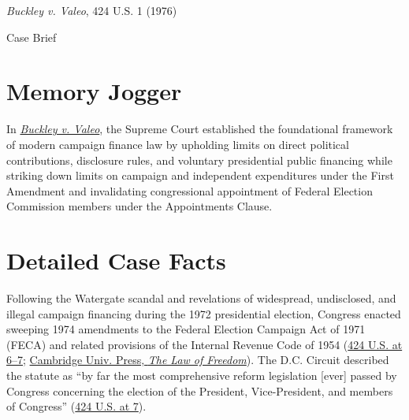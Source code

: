 \documentclass[12pt]{article}
\begin{document}
\begin{center}
{\LARGE \textit{Buckley v. Valeo}, 424 U.S. 1 (1976)\par}
\vspace{0.8em}
{\large Case Brief\par}
\end{center}
\vspace{1em}

\section{Memory Jogger}

In \href{https://www.courtlistener.com/opinion/109380/buckley-v-valeo/}{\textit{Buckley v. Valeo}}, the Supreme Court established the foundational framework of modern campaign finance law by upholding limits on direct political contributions, disclosure rules, and voluntary presidential public financing while striking down limits on campaign and independent expenditures under the First Amendment and invalidating congressional appointment of Federal Election Commission members under the Appointments Clause.

\section{Detailed Case Facts}

Following the Watergate scandal and revelations of widespread, undisclosed, and illegal campaign financing during the 1972 presidential election, Congress enacted sweeping 1974 amendments to the Federal Election Campaign Act of 1971 (FECA) and related provisions of the Internal Revenue Code of 1954 (\href{https://supreme.justia.com/cases/federal/us/424/1/}{424 U.S. at 6--7}; \href{https://www.cambridge.org/core/books/law-of-freedom/campaign-finance/67D70830F386B05225DCEF7D8D8C25C7}{Cambridge Univ. Press, \textit{The Law of Freedom}}). The D.C. Circuit described the statute as ``by far the most comprehensive reform legislation [ever] passed by Congress concerning the election of the President, Vice-President, and members of Congress'' (\href{https://supreme.justia.com/cases/federal/us/424/1/}{424 U.S. at 7}).
\end{document}
